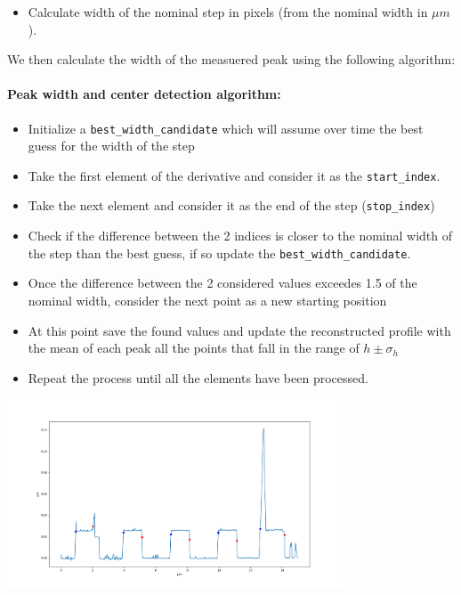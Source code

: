 \documentclass{article}
\begin{document}
\begin{itemize}
    \item Calculate width of the nominal step in pixels (from the nominal width in $\mu m$).
\end{itemize}
We then calculate the width of the measuered peak using the following algorithm:
\paragraph{Peak width and center detection algorithm: }

\begin{itemize}
    \item Initialize a \texttt{best\_width\_candidate} which will assume over time the best guess for the width of the step
    \item Take the first element of the derivative and consider it as the \texttt{start\_index}.
    \item Take the next element and consider it as the end of the step (\texttt{stop\_index}) 
    \item Check if the difference between the 2 indices is closer to the nominal width of the step than the best guess, if so update the \texttt{best\_width\_candidate}.
    \item Once the difference between the 2 considered values exceedes 1.5 of the nominal width, consider the next point as a new starting position
    \item At this point save the found values and update the reconstructed profile with the mean of each peak all the points that fall in the range of $h \pm \sigma_{h}$
    \item Repeat the process until all the elements have been processed.
\end{itemize}
\begin{center}
    \includegraphics[width=0.75\textwidth]{../images/steps_4.png}
\end{center}
\end{document}
